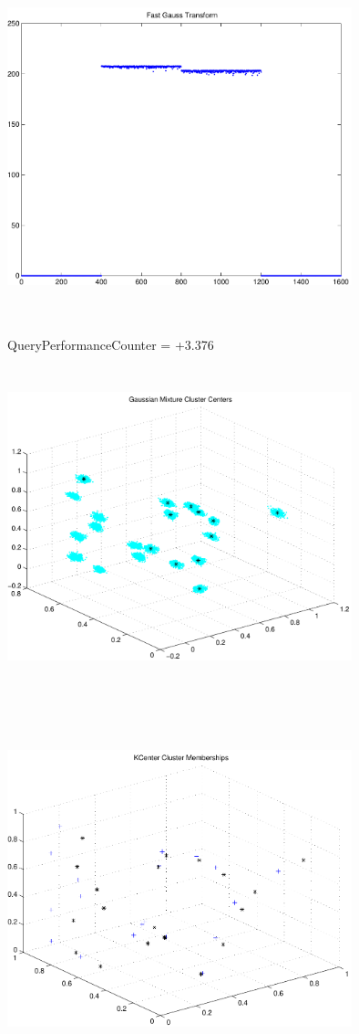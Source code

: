 \documentclass[9pt]{article}
\theoremstyle{plain}
\theoremstyle{definition}
\theoremstyle{remark}
\numberwithin{equation}{section}
\begin{document}
\includegraphics[width=10.0cm,height=10.0cm]{FGT4_Centers.pdf}

QueryPerformanceCounter  =  +3.376
\includegraphics[width=10.0cm,height=10.0cm]{GaussianMixture_ClusterCenters20_Centers.pdf}

\includegraphics[width=10.0cm,height=10.0cm]{KCenterClusterMemberships_20_Centers.pdf}
\end{document}
